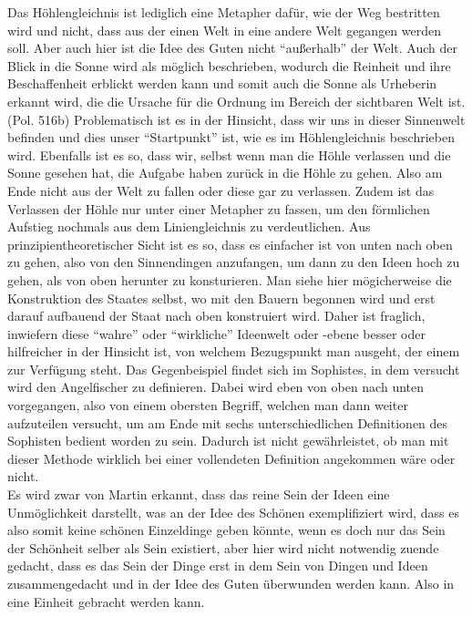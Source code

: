Das Höhlengleichnis ist lediglich eine Metapher dafür, wie der Weg bestritten wird und nicht, dass aus der einen Welt in eine andere Welt gegangen werden soll.  Aber auch hier ist die Idee des Guten nicht \enquote{außerhalb} der Welt. Auch der Blick in die Sonne wird als möglich beschrieben, wodurch die Reinheit und ihre Beschaffenheit erblickt werden kann und somit auch die Sonne als Urheberin erkannt wird, die die Ursache für die Ordnung im Bereich der sichtbaren Welt ist. (Pol. 516b)
Problematisch ist es in der Hinsicht, dass wir uns in dieser Sinnenwelt befinden und dies unser \enquote{Startpunkt} ist, wie es im Höhlengleichnis beschrieben wird. Ebenfalls ist es so, dass wir, selbst wenn man die Höhle verlassen und die Sonne gesehen hat, die Aufgabe haben zurück in die Höhle zu gehen. Also am Ende nicht aus der Welt zu fallen oder diese gar zu verlassen. Zudem ist das Verlassen der Höhle nur unter einer Metapher zu fassen, um den förmlichen Aufstieg nochmals aus dem Liniengleichnis zu verdeutlichen.
Aus prinzipientheoretischer Sicht ist es so, dass es einfacher ist von unten nach oben zu gehen, also von den Sinnendingen anzufangen, um dann zu den Ideen hoch zu gehen, als von oben herunter zu konsturieren. Man siehe hier mögicherweise die Konstruktion des Staates selbst, wo mit den Bauern begonnen wird und erst darauf aufbauend der Staat nach oben konstruiert wird. Daher ist fraglich, inwiefern diese \enquote{wahre} oder \enquote{wirkliche} Ideenwelt oder -ebene besser oder hilfreicher in der Hinsicht ist, von welchem Bezugspunkt man ausgeht, der einem zur Verfügung steht. 
Das Gegenbeispiel findet sich im Sophistes, in dem versucht wird den Angelfischer zu definieren. Dabei wird eben von oben nach unten vorgegangen, also von einem obersten Begriff, welchen man dann weiter aufzuteilen versucht, um am Ende mit sechs unterschiedlichen Definitionen des Sophisten bedient worden zu sein. Dadurch ist nicht gewährleistet, ob man mit dieser Methode wirklich bei einer vollendeten Definition angekommen wäre oder nicht.\\
Es wird zwar von Martin erkannt, dass das reine Sein der Ideen eine Unmöglichkeit darstellt, was an der Idee des Schönen exemplifiziert wird, dass es also somit keine schönen Einzeldinge geben könnte, wenn es doch nur das Sein der Schönheit selber als Sein existiert, aber hier wird nicht notwendig zuende gedacht, dass es das Sein der Dinge erst in dem Sein von Dingen und Ideen zusammengedacht und in der Idee des Guten überwunden werden kann. Also in eine Einheit gebracht werden kann. 
